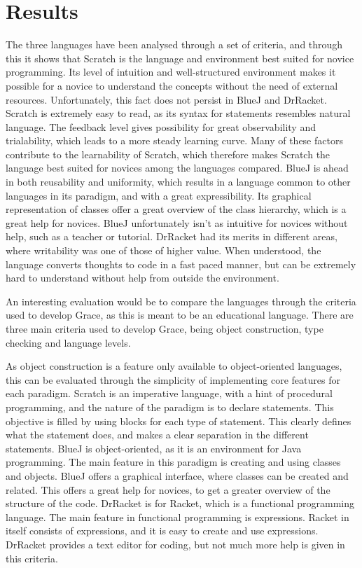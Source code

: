 \chapter{Results}
\label{chap:results}

The three languages have been analysed through a set of criteria, and through this it shows that Scratch is the language and environment best suited for novice programming. Its level of intuition and well-structured environment makes it possible for a novice to understand the concepts without the need of external resources. Unfortunately, this fact does not persist in BlueJ and DrRacket. Scratch is extremely easy to read, as its syntax for statements resembles natural language. The feedback level gives possibility for great observability and trialability, which leads to a more steady learning curve. Many of these factors contribute to the learnability of Scratch, which therefore makes Scratch the language best suited for novices among the languages compared. BlueJ is ahead in both reusability and uniformity, which results in a language common to other languages in its paradigm, and with a great expressibility. Its graphical representation of classes offer a great overview of the class hierarchy, which is a great help for novices. BlueJ unfortunately isn't as intuitive for novices without help, such as a teacher or tutorial. DrRacket had its merits in different areas, where writability was one of those of higher value. When understood, the language converts thoughts to code in a fast paced manner, but can be extremely hard to understand without help from outside the environment.

An interesting evaluation would be to compare the languages through the criteria used to develop Grace\cite{grace}, as this is meant to be an educational language. There are three main criteria used to develop Grace, being object construction, type checking and language levels. 

As object construction is a feature only available to object-oriented languages, this can be evaluated through the simplicity of implementing core features for each paradigm. Scratch is an imperative language, with a hint of procedural programming, and the nature of the paradigm is to declare statements. This objective is filled by using blocks for each type of statement. This clearly defines what the statement does, and makes a clear separation in the different statements. BlueJ is object-oriented, as it is an environment for Java programming. The main feature in this paradigm is creating and using classes and objects. BlueJ offers a graphical interface, where classes can be created and related. This offers a great help for novices, to get a greater overview of the structure of the code. DrRacket is for Racket, which is a functional programming language. The main feature in functional programming is expressions. Racket in itself consists of expressions, and it is easy to create and use expressions. DrRacket provides a text editor for coding, but not much more help is given in this criteria.

